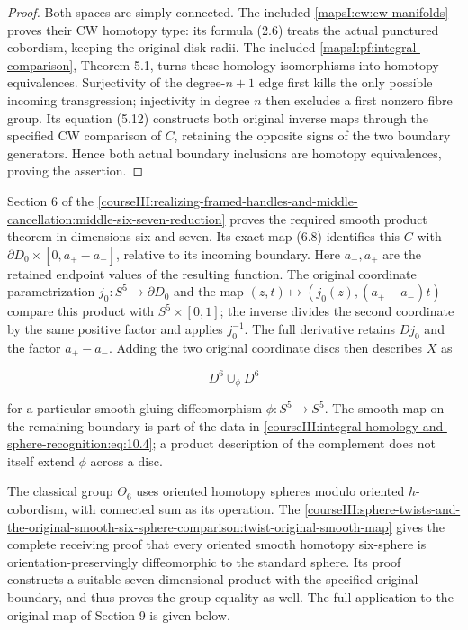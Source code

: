 \begin{proof}
Both spaces are simply connected. The included \cref{mapsI:cw:cw-manifolds} proves their CW homotopy type: its formula (2.6) treats the actual punctured cobordism, keeping the original disk radii. The included \cref{mapsI:pf:integral-comparison}, Theorem 5.1, turns these homology isomorphisms into homotopy equivalences. Surjectivity of the degree-\(n+1\) edge first kills the only possible incoming transgression; injectivity in degree \(n\) then excludes a first nonzero fibre group. Its equation (5.12) constructs both original inverse maps through the specified CW comparison of \(C\), retaining the opposite signs of the two boundary generators. Hence both actual boundary inclusions are homotopy equivalences, proving the assertion.
\end{proof}

Section 6 of the \cref{courseIII:realizing-framed-handles-and-middle-cancellation:middle-six-seven-reduction} proves the required smooth product theorem in dimensions six and seven. Its exact map (6.8) identifies this \(C\) with \(\partial D_0\times[0,a_+-a_-]\), relative to its incoming boundary. Here \(a_-,a_+\) are the retained endpoint values of the resulting function. The original coordinate parametrization \(j_0:S^5\to\partial D_0\) and the map \((z,t)\mapsto(j_0(z),(a_+-a_-)t)\) compare this product with \(S^5\times[0,1]\); the inverse divides the second coordinate by the same positive factor and applies \(j_0^{-1}\). The full derivative retains \(Dj_0\) and the factor \(a_+-a_-\). Adding the two original coordinate discs then describes \(X\) as

\begin{equation}
D^6\cup_\phi D^6
\label{courseIII:integral-homology-and-sphere-recognition:eq:10.4}
\end{equation}

for a particular smooth gluing diffeomorphism \(\phi:S^5\to S^5\). The smooth map on the remaining boundary is part of the data in \eqref{courseIII:integral-homology-and-sphere-recognition:eq:10.4}; a product description of the complement does not itself extend \(\phi\) across a disc.

The classical group \(\Theta_6\) uses oriented homotopy spheres modulo oriented \(h\)-cobordism, with connected sum as its operation. The \cref{courseIII:sphere-twists-and-the-original-smooth-six-sphere-comparison:twist-original-smooth-map} gives the complete receiving proof that every oriented smooth homotopy six-sphere is orientation-preservingly diffeomorphic to the standard sphere. Its proof constructs a suitable seven-dimensional product with the specified original boundary, and thus proves the group equality as well. The full application to the original map of Section 9 is given below.


